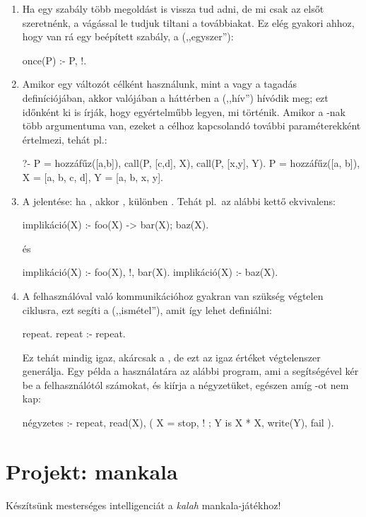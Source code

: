\begin{enumerate}
\item Ha egy szabály több megoldást is vissza tud
  adni, de mi csak az elsőt szeretnénk, a vágással
  le tudjuk tiltani a továbbiakat. Ez elég gyakori
  ahhoz, hogy van rá egy beépített szabály, a
   (,,egyszer''):
\begin{program}
once(P) :- P, !.
\end{program}
\item Amikor egy  változót célként használunk,
  mint a  vagy a tagadás definíciójában,
  akkor valójában a háttérben a 
  (,,hív'') hívódik meg; ezt időnként ki is írják,
  hogy egyértelműbb legyen, mi történik. Amikor a
  -nak több argumentuma van, ezeket a
  célhoz kapcsolandó további paraméterekként
  értelmezi, tehát pl.:
\begin{query}
?- P = hozzáfűz([a,b]),
   call(P, [c,d], X),
   call(P, [x,y], Y).
P = hozzáfűz([a, b]),
X = [a, b, c, d],
Y = [a, b, x, y].
\end{query}
\item A  jelentése: ha , akkor
  , különben . Tehát pl.~az alábbi kettő
  ekvivalens:
\index{\pr{->}}
\begin{program}
implikáció(X) :- foo(X) -> bar(X); baz(X).
\end{program}   
és
\begin{program}
implikáció(X) :- foo(X), !, bar(X).
implikáció(X) :- baz(X).
\end{program}
\item A felhasználóval való kommunikációhoz gyakran
  van szükség végtelen ciklusra, ezt segíti a
   (,,ismétel''), amit így lehet
  definiálni:
\begin{program}  
repeat.
repeat :- repeat.
\end{program}
Ez tehát mindig igaz, akárcsak a , de ezt
az igaz értéket végtelenszer generálja. Egy példa a
használatára az alábbi program, ami a 
segítségével kér be a felhasználótól számokat, és
kiírja a négyzetüket, egészen amíg -ot nem
kap:
\begin{program}
négyzetes :-
    repeat, read(X),
    ( X = stop, !
    ; Y is X * X, write(Y), fail
    ).
\end{program}
\end{enumerate}

\section{Projekt: mankala}
Készítsünk mesterséges intelligenciát a \emph{kalah}
mankala-játékhoz!

